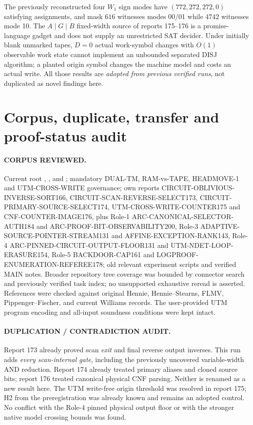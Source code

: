 \documentclass[11pt]{article}
\begin{document}
The previously reconstructed four $W_1$ sign modes have $(772,272,272,0)$ satisfying assignments, and mask $616$ witnesses modes 00/01 while $4742$ witnesses mode 10. The $A\mid G\mid B$ fixed-width source of reports 175--176 is a promise-language gadget and does not supply an unrestricted SAT decider. Under initially blank unmarked tapes, $D=0$ actual work-symbol changes with $O(1)$ observable work state cannot implement an unbounded separated DISJ algorithm; a planted origin symbol changes the machine model and costs an actual write. All those results are \emph{adopted from previous verified runs}, not duplicated as novel findings here.

\section{Corpus, duplicate, transfer and proof-status audit}
\paragraph{CORPUS REVIEWED.} Current root , ,  and ; mandatory DUAL-TM, RAM-vs-TAPE, HEADMOVE-1 and UTM-CROSS-WRITE governance; own reports CIRCUIT-OBLIVIOUS-INVERSE-SORT166, CIRCUIT-SCAN-REVERSE-SELECT173, CIRCUIT-PRIMARY-SOURCE-SELECT174, UTM-CROSS-WRITE-COUNTER175 and CNF-COUNTER-IMAGE176, plus Role-1 ARC-CANONICAL-SELECTOR-AUTH184 and ARC-PROOF-BIT-OBSERVABILITY200, Role-3 ADAPTIVE-SOURCE-POINTER-STREAM131 and AFFINE-EXCEPTION-RANK143, Role-4 ARC-PINNED-CIRCUIT-OUTPUT-FLOOR131 and UTM-NDET-LOOP-ERASURE154, Role-5 BACKDOOR-CAP161 and LOGPROOF-ENUMERATION-REFEREE178; old relevant experiment scripts and verified MAIN notes. Broader repository tree coverage was bounded by connector search and previously verified task index; no unsupported exhaustive reread is asserted. References were checked against original Hennie, Hennie--Stearns, FLMV, Pippenger--Fischer, and current Williams records. The user-provided UTM program encoding and all-input soundness conditions were kept intact.

\paragraph{DUPLICATION / CONTRADICTION AUDIT.} Report 173 already proved scan \emph{exit} and final reverse output inverses. This run adds \emph{every scan-internal gate}, including the previously uncovered variable-width AND reduction. Report 174 already treated primary aliases and cloned source bits; report 176 treated canonical physical CNF parsing. Neither is renamed as a new result here. The UTM write-free origin threshold was resolved in report 175; H2 from the preregistration was already known and remains an adopted control. No conflict with the Role-4 pinned physical output floor or with the stronger native model crossing bounds was found.
\end{document}
